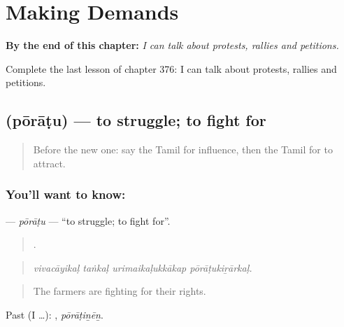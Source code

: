 
\chapter{Making Demands}
\label{ch:ta-making-demands}

\begin{chapteropening}
\textbf{By the end of this chapter:} \emph{I can talk about protests, rallies and petitions.}

Complete the last lesson of chapter 376: I can talk about protests, rallies and petitions.
\end{chapteropening}

\section[\texorpdfstring{\ta{போராடு} (pōrāṭu)}{போராடு (pōrāṭu)}]{ (pōrāṭu) — to struggle; to fight for}

\label{lesson:TA-C376-poratu}



\begin{quote}
Before the new one: say the Tamil for influence, then the Tamil for to attract.
\end{quote}

\subsection*{You'll want to know: }
\textbf{} — \emph{pōrāṭu} — \textquotedblleft{}to struggle; to fight for\textquotedblright{}.

\begin{quote}
   .
\end{quote}

\begin{quote}
\emph{vivacāyikaḷ taṅkaḷ urimaikaḷukkākap pōrāṭukiṟārkaḷ.}
\end{quote}

\begin{quote}
The farmers are fighting for their rights.
\end{quote}

Past (I …): , \emph{pōrāṭiṉēṉ}.

